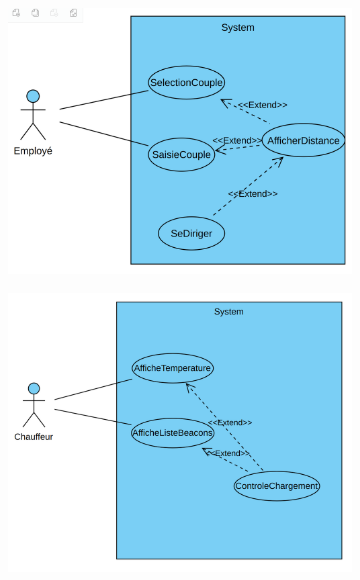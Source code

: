\documentclass[10pt,a4paper]{article}
\begin{document}
\begin{figure}[h!]
    \centering
    \begin{subfigure}[b]{0.45\textwidth}
        \centering
        \includegraphics[scale=0.14]{Images/recherche-actif.png}
        \caption{}
        \label{recherche-actif.png1}
    \end{subfigure}
    \begin{subfigure}[b]{0.45\textwidth}
        \includegraphics[scale=0.14]{Images/controle-chargement.png}
        \caption{}
        \label{controle-chargement.png1}
    \end{subfigure}
    \caption{}
\end{figure}
\end{document}

